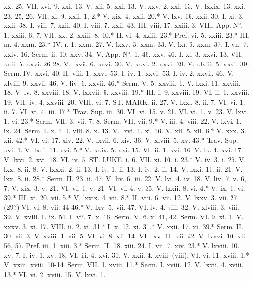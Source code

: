 xx. 25.	VII. xvi. 9.
xxi. 13.	V. xii. 5.
xxi. 13.	V. xxv. 2.
xxi. 13.	V. lxxix. 13.
xxi. 23, 25, 26.	VII. xi. 9.
xxii. 1, 2.*	V. xix. 4.
xxii. 20.*	V. lxv. 16.
xxii. 30.	I. xi. 3.
xxii. 38.	I. viii. 7.
xxii. 40.	I. viii. 7.
xxii. 43.	III. viii. 17.
xxiii. 3.	VIII. App. N°. 1.
xxiii. 6, 7.	VII. xx. 2.
xxiii. 8, 10.*	II. vi. 4.
xxiii. 23.*	Pref. vi. 5.
xxiii. 23.*	III. iii. 4.
xxiii. 23.*	IV. i. 1.
xxiii. 27.	V. lxxv. 3.
xxiii. 33.	V. lxi. 5.
xxiii. 37.	I. vii. 7.
xxiv. 16.	Serm. ii. 10.
xxv. 34.	V. App. N°. 1. 46.
xxv. 46.	I. xi. 3.
xxvi. 13.	VII. xxii. 5.
xxvi. 26-28.	V. lxvii. 6.
xxvi. 30.	V. xxvi. 2.
xxvi. 39.	V. xlviii. 5.
xxvi. 39.	Serm. IV.
xxvi. 40.	II. viii. 1.
xxvi. 53.	I. iv. 1.
xxvi. 53.	I. iv. 2.
xxvii. 46.	V. xlviii. 9.
xxvii. 46.	V. liv. 6.
xxvii. 46.*	Serm. V. 5.
xxviii. 1.	V. lxxi. 11.
xxviii. 18.	V. lv. 8.
xxviii. 18.	V. lxxvii. 6.
xxviii. 19.*	III. i. 9.
xxviii. 19.	VI. ii. 1.
xxviii. 19.	VII. iv. 4.
xxviii. 20.	VIII. vi. 7.
ST. MARK.
ii. 27.	V. lxxi. 8.
ii. 7.	VI. vi. 1.
ii. 7.	VI. vi. 4.
iii. 17.*	Trav. Sup.
iii. 30.	VI. vi. 15.
v. 21.	VI. vi. 1.
v. 23.	V. lxvi. 1.
vi. 23.*	Serm. VII. 3.
vii. 7, 8.	Serm. VII.
vii. 9.*	V. iii. 4.
viii. 22.	V. lxvi. 1.
ix. 24.	Serm. I.
x. 4.	I. viii. 8.
x. 13.	V. lxvi. 1.
xi. 16.	V. xii. 5.
xii. 6.*	V. xxx. 3.
xii. 42.*	VI. vi. 17.
xiv. 22.	V. lxvii. 6.
xiv. 36.	V. xlviii. 5.
xv. 43.*	Trav. Sup.
xvi. 1.	V. lxxi. 11.
xvi. 5.*	V. xxix. 5.
xvi. 15.	VI. ii. 1.
xvi. 16.	V. lx. 4.
xvi. 17.	V. lxvi. 2.
xvi. 18.	VI. iv. 5.
ST. LUKE.
i. 6.	VII. xi. 10.
i. 23.*	V. iv. 3.
i. 26.	V. lxx. 8.
ii. 8.	V. lxxxi. 2.
ii. 13.	I. iv. 1.
ii. 13.	I. iv. 2.
ii. 14.	V. lxxi. 11.
ii. 21.	V. lxx. 8.
ii. 28.*	Serm. II. 23.
ii. 47.	V. liv. 6.
iii. 22.	V. lvi. 4.
iv. 18.	V. liv. 7.
v. 6, 7.	V. xix. 3.
v. 21.	VI. vi. 1.
v. 21.	VI. vi. 4.
v. 35.	V. lxxii. 8.
vi. 4.*	V. ix. 1.
vi. 39.*	III. xi. 20.
vii. 5.*	V. lxxix. 4.
vii. 8.*	II. viii. 6.
vii. 12.	V. lxxv. 3.
vii. 27. (29?)	VI. vi. 8.
vii. 44-46.*	V. lxv. 5.
vii. 47.	VI. iv. 4.
viii. 32.	V. xlviii. 3.
viii. 39.	V. xviii. 1.
ix. 54.	I. vii. 7.
x. 16.	Serm. V. 6.
x. 41, 42.	Serm. VI. 9.
xi. 1.	V. xxxv. 3.
xi. 17.	VIII. ii. 2.
xi. 31.*	I. x. 12.
xi. 31.*	V. xxii. 17.
xi. 39.*	Serm. II. 30.
xii. 3.	V. xviii. 1.
xii. 5.	VI. vi. 8.
xii. 14.	VII. xv. 11.
xii. 42.	V. lxxvi. 10.
xii. 56, 57.	Pref. iii. 1.
xiii. 3.*	Serm. II. 18.
xiii. 24.	I. vii. 7.
xiv. 23.*	V. lxviii. 10.
xv. 7.	I. iv. 1.
xv. 18.	VI. iii. 4.
xvi. 31.	V. xxii. 4.
xviii. (viii).	VI. vi. 11.
xviii. 1.*	V. xxiii.
xviii. 10-14.	Serm. VII. 1.
xviii. 11.*	Serm. I.
xviii. 12.	V. lxxii. 4.
xviii. 13.*	VI. vi. 2.
xviii. 15.	V. lxvi. 1.
